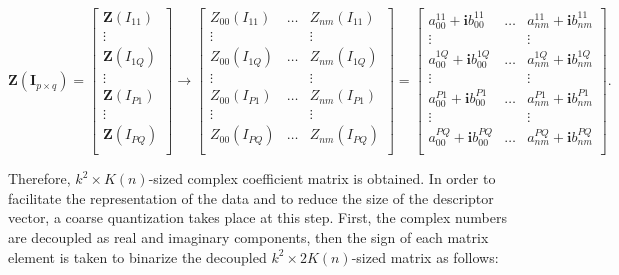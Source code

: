 \documentclass[]{spie}  %
\begin{document}
\begin{equation}
\mathbf{Z} ( \mathbf{I}_{p\times q} )= 
\begin{bmatrix}
\mathbf{Z}(I_{11}) \\
  \vdots \\
\mathbf{Z}(I_{1Q}) \\
  \vdots \\
\mathbf{Z}(I_{P1}) \\
  \vdots \\
\mathbf{Z}(I_{PQ}) \\
 \end{bmatrix}
 \longrightarrow
 \begin{bmatrix}
Z_{00}(I_{11}) & \hdots & Z_{nm}(I_{11}) \\
  \vdots  & & \vdots \\
Z_{00}(I_{1Q}) & \hdots & Z_{nm}(I_{1Q}) \\
  \vdots  & & \vdots \\
Z_{00}(I_{P1}) & \hdots & Z_{nm}(I_{P1}) \\
  \vdots  & & \vdots \\
Z_{00}(I_{PQ}) & \hdots & Z_{nm}(I_{PQ}) \\
 \end{bmatrix} = 
 \begin{bmatrix}
a_{00}^{11} + \mathbf{i}b_{00}^{11} & \hdots & a_{nm}^{11} + \mathbf{i}b_{nm}^{11} \\
  \vdots  & & \vdots \\
a_{00}^{1Q} + \mathbf{i}b_{00}^{1Q} & \hdots & a_{nm}^{1Q} + \mathbf{i}b_{nm}^{1Q} \\
  \vdots  & & \vdots \\
a_{00}^{P1} + \mathbf{i}b_{00}^{P1} & \hdots & a_{nm}^{P1} + \mathbf{i}b_{nm}^{P1} \\
  \vdots  & & \vdots \\
a_{00}^{PQ} + \mathbf{i}b_{00}^{PQ} & \hdots & a_{nm}^{PQ} + \mathbf{i}b_{nm}^{PQ} \\
 \end{bmatrix}.
 \label{eq:lzm_op}
\end{equation}

Therefore, $k^2\times K(n)$-sized complex coefficient matrix is obtained. In order to facilitate the representation of the data and to reduce the size of the descriptor vector, a coarse quantization takes place at this step. First, the complex numbers are decoupled as real and imaginary components, then the sign of each matrix element is taken to binarize the decoupled $k^2\times 2K(n)$-sized matrix as follows:
\end{document}
